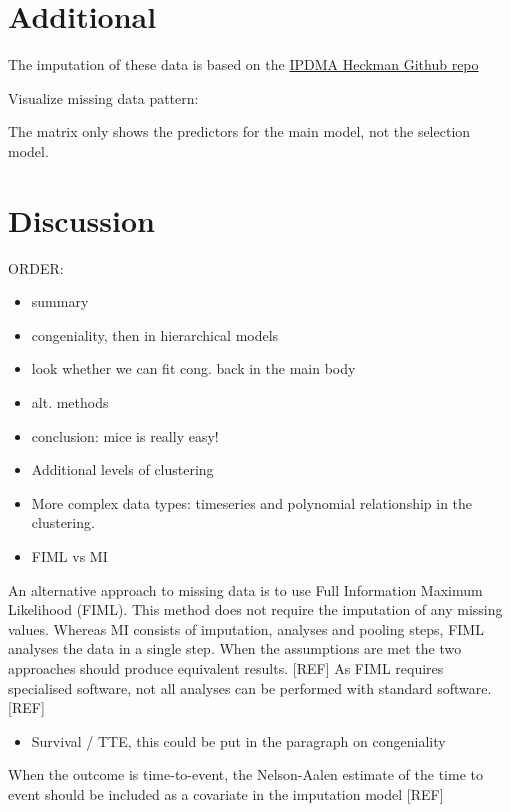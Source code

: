 \documentclass[
]{jss}
\providecommand{\tightlist}{%
  \setlength{\itemsep}{0pt}\setlength{\parskip}{0pt}}
\begin{document}
\hypertarget{additional}{%
\section{Additional}\label{additional}}

The imputation of these data is based on the
\href{https://github.com/johamunoz/Heckman-IPDMA/blob/main/Toy_example.R}{IPDMA
Heckman Github repo}

Visualize missing data pattern:

The matrix only shows the predictors for the main model, not the
selection model.

\hypertarget{discussion}{%
\section{Discussion}\label{discussion}}

ORDER:

\begin{itemize}
\item
  summary
\item
  congeniality, then in hierarchical models
\item
  look whether we can fit cong. back in the main body
\item
  alt. methods
\item
  conclusion: mice is really easy!
\item
  Additional levels of clustering
\item
  More complex data types: timeseries and polynomial relationship in the
  clustering.
\item
  FIML vs MI
\end{itemize}

An alternative approach to missing data is to use Full Information
Maximum Likelihood (FIML). This method does not require the imputation
of any missing values. Whereas MI consists of imputation, analyses and
pooling steps, FIML analyses the data in a single step. When the
assumptions are met the two approaches should produce equivalent
results. {[}REF{]} As FIML requires specialised software, not all
analyses can be performed with standard software. {[}REF{]}

\begin{itemize}
\tightlist
\item
  Survival / TTE, this could be put in the paragraph on congeniality
\end{itemize}

When the outcome is time-to-event, the Nelson-Aalen estimate of the time
to event should be included as a covariate in the imputation model
{[}REF{]}
\end{document}
